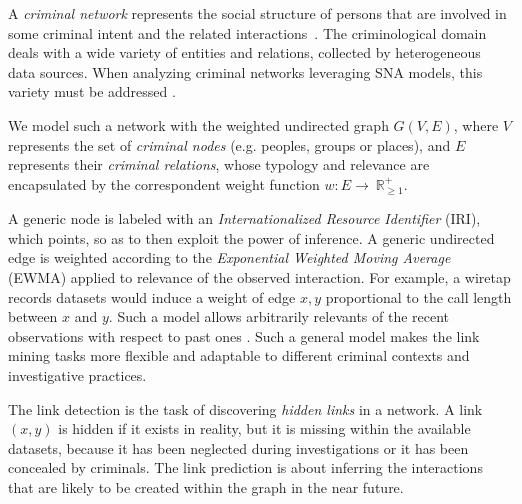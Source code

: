 

A \textit{criminal network} represents the social structure of persons that are involved in some criminal intent and the related interactions~\cite{von2001organisierte}.
%
The criminological domain deals with a wide variety of entities and relations, collected by heterogeneous data sources. 
When analyzing criminal networks leveraging SNA models, this variety must be addressed \cite{pramanik2016framework}.

We model such a network with the weighted undirected graph $G(V,E)$, where  $ V$ represents the set of \textit{criminal nodes} (e.g. peoples, groups or places), and $E$ represents their \textit{criminal relations}, whose typology and relevance are encapsulated by the correspondent weight function $w:E\rightarrow~\mathbb{R}_{\geq1}^{+}$. 

A generic node is labeled with an \textit{Internationalized Resource Identifier} (IRI), which points, so as to then exploit the power of inference.
A generic undirected edge is weighted according to the \textit{Exponential Weighted Moving Average} (EWMA) applied to relevance of the observed interaction. 
For example, a wiretap records datasets would induce a weight of edge $x,y$ proportional to the call length between $x$ and $y$.
Such a model allows arbitrarily relevants of the recent observations with respect to past ones \cite{lucas1990exponentially}. 
Such a general model makes the link mining tasks more flexible and adaptable to different criminal contexts and investigative practices.


The link detection is the task of discovering \textit{hidden links} in a network. 
A link $(x,y)$ is hidden if it exists in reality, but it is missing within the available datasets, because it has been neglected during investigations or it has been concealed by criminals.
%
%
The link prediction is about inferring the interactions that are likely to be created within the graph in the near future. 
%



